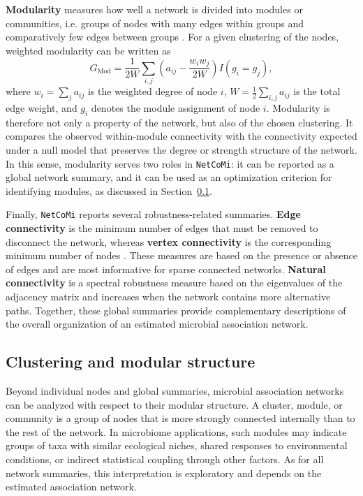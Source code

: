 \textbf{Modularity} measures how well a network is divided into modules or communities, i.e. groups of nodes with many edges within groups and comparatively few edges between groups \citep{clauset2004finding}. For a given clustering of the nodes, weighted modularity can be written as
\begin{equation}
\label{eq:5net:net_analysis:modularity}
G_{\mathrm{Mod}} = \frac{1}{2W}\sum_{i,j}\left(a_{ij} - \frac{w_i w_j}{2W}\right) I(g_i = g_j),
\end{equation}
where $w_i=\sum_j a_{ij}$ is the weighted degree of node $i$, $W=\frac{1}{2}\sum_{i,j}a_{ij}$ is the total edge weight, and $g_i$ denotes the module assignment of node $i$. Modularity is therefore not only a property of the network, but also of the chosen clustering. It compares the observed within-module connectivity with the connectivity expected under a null model that preserves the degree or strength structure of the network. In this sense, modularity serves two roles in \texttt{NetCoMi}: it can be reported as a global network summary, and it can be used as an optimization criterion for identifying modules, as discussed in Section~\ref{sec:5net:net_analysis:clustering}.

Finally, \texttt{NetCoMi} reports several robustness-related summaries. \textbf{Edge connectivity} is the minimum number of edges that must be removed to disconnect the network, whereas \textbf{vertex connectivity} is the corresponding minimum number of nodes \citep{white2001cohesiveness}. These measures are based on the presence or absence of edges and are most informative for sparse connected networks. \textbf{Natural connectivity} is a spectral robustness measure based on the eigenvalues of the adjacency matrix and increases when the network contains more alternative paths. Together, these global summaries provide complementary descriptions of the overall organization of an estimated microbial association network.


\subsection{Clustering and modular structure}
\label{sec:5net:net_analysis:clustering}

Beyond individual nodes and global summaries, microbial association networks can be analyzed with respect to their modular structure. A cluster, module, or community is a group of nodes that is more strongly connected internally than to the rest of the network. In microbiome applications, such modules may indicate groups of taxa with similar ecological niches, shared responses to environmental conditions, or indirect statistical coupling through other factors. As for all network summaries, this interpretation is exploratory and depends on the estimated association network.

